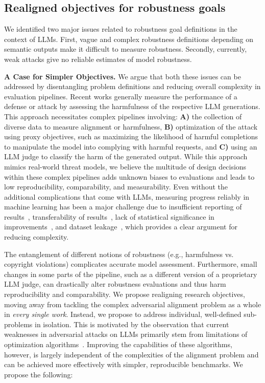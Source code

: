 

\vspace{-5pt}
\subsection{Realigned objectives for robustness goals}\label{sec:pos-goals-realigned}

We identified two major issues related to robustness goal definitions in the context of LLMs. First, vague and complex robustness definitions depending on semantic outputs make it difficult to measure robustness. Secondly, currently, weak attacks give no reliable estimates of model robustness.  

\textbf{A Case for Simpler Objectives.} We argue that both these issues can be addressed by disentangling problem definitions and reducing overall complexity in evaluation pipelines. Recent works generally measure the performance of a defense or attack by assessing the harmfulness of the respective LLM generations. This approach necessitates complex pipelines involving: \textbf{A)} the collection of diverse data to measure alignment or harmfulness, \textbf{B)} optimization of the attack using proxy objectives, such as maximizing the likelihood of harmful completions to manipulate the model into complying with harmful requests, and \textbf{C)} using an LLM judge to classify the harm of the generated output. While this approach mimics real-world threat models, we believe the multitude of design decisions within these complex pipelines adds unknown biases to evaluations and leads to low reproducibility, comparability, and measurability. Even without the additional complications that come with LLMs, measuring progress reliably in machine learning has been a major challenge due to insufficient reporting of results~\cite{dodge2019show}, transferability of results~\cite{liao2021we}, lack of statistical significance in improvements~\cite{card2020little}, and dataset leakage~\cite{kapoor2022leakage}, which provides a clear argument for reducing complexity. 

The entanglement of different notions of robustness (e.g., harmfulness vs. copyright violations) complicates accurate model assessment. 
Furthermore, small changes in some parts of the pipeline, such as a different version of a proprietary LLM judge, can drastically alter robustness evaluations and thus harm reproducibility and comparability. 
We propose realigning research objectives, moving away from tackling the complex adversarial alignment problem as a whole in \textit{every single work}. 
Instead, we propose to address individual, well-defined sub-problems in isolation. This is motivated by the observation that current weaknesses in adversarial attacks on LLMs primarily stem from limitations of optimization algorithms~\cite{carlini2023aligned}. Improving the capabilities of these algorithms, however, is largely independent of the complexities of the alignment problem and can be achieved more effectively with simpler, reproducible benchmarks. We propose the following:

